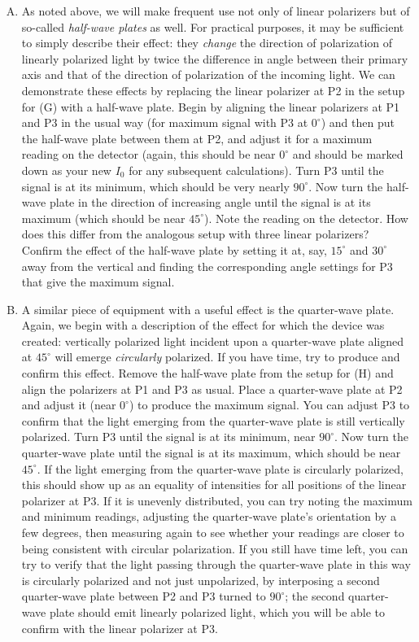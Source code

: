 \begin{enumerate}[(A)]
\item As noted above, we will make frequent use not only of linear polarizers but of so-called \emph{half-wave plates} as well. For practical purposes, it may be sufficient to simply describe their effect: they \emph{change} the direction of polarization of linearly polarized light by twice the difference in angle between their primary axis and that of the direction of polarization of the incoming light. We can demonstrate these effects by replacing the linear polarizer at P2 in the setup for (G) with a half-wave plate. Begin by aligning the linear polarizers at P1 and P3 in the usual way (for maximum signal with P3 at $0^\circ$) and then put the half-wave plate between them at P2, and adjust it for a maximum reading on the detector (again, this should be near $0^\circ$ and should be marked down as your new $I_0$ for any subsequent calculations). Turn P3 until the signal is at its minimum, which should be very nearly $90^\circ$. Now turn the half-wave plate in the direction of increasing angle until the signal is at its maximum (which should be near $45^\circ$). Note the reading on the detector. How does this differ from the analogous setup with three linear polarizers? Confirm the effect of the half-wave plate by setting it at, say, $15^\circ$ and $30^\circ$ away from the vertical and finding the corresponding angle settings for P3 that give the maximum signal.

\item A similar piece of equipment with a useful effect is the quarter-wave plate. Again, we begin with a description of the effect for which the device was created: vertically polarized light incident upon a quarter-wave plate aligned at $45^\circ$ will emerge \emph{circularly} polarized. If you have time, try to produce and confirm this effect. Remove the half-wave plate from the setup for (H) and align the polarizers at P1 and P3 as usual. Place a quarter-wave plate at P2 and adjust it (near $0^\circ$) to produce the maximum signal. You can adjust P3 to confirm that the light emerging from the quarter-wave plate is still vertically polarized. Turn P3 until the signal is at its minimum, near $90^\circ$. Now turn the quarter-wave plate until the signal is at its maximum, which should be near $45^\circ$. If the light emerging from the quarter-wave plate is circularly polarized, this should show up as an equality of intensities for all positions of the linear polarizer at P3. If it is unevenly distributed, you can try noting the maximum and minimum readings, adjusting the quarter-wave plate's orientation by a few degrees, then measuring again to see whether your readings are closer to being consistent with circular polarization. If you still have time left, you can try to verify that the light passing through the quarter-wave plate in this way is circularly polarized and not just unpolarized, by interposing a second quarter-wave plate between P2 and P3 turned to $90^\circ$; the second quarter-wave plate should emit linearly polarized light, which you will be able to confirm with the linear polarizer at P3.

\end{enumerate}

